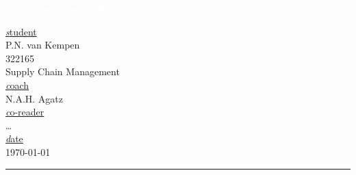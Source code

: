 \begin{titlingpage}
\linespread{1}\selectfont

\BgThispage
{}
\vspace*{2cm}
\noindent
\textcolor{white}{\bigsf Airfare lock-in products}
\vspace*{1.7cm}\par
\noindent
\begin{minipage}{0.35\linewidth}
    \begin{flushright}
    \underline {\small \textit student}\vspace{0.3ex}\\
    P.N. van Kempen \\
    322165 \\
    Supply Chain Management\vspace{3ex} \\
    \underline {\small \textit coach}\vspace{0.3ex}\\
    N.A.H. Agatz\vspace{1.5ex} \\
    \underline {\small \textit co-reader}\vspace{0.3ex}\\
    \ldots\vspace{3ex}\\
    \underline {\small \textit date}\vspace{0.3ex}\\
    \today\\
    \end{flushright}
\end{minipage} \hspace{15pt}
%
\begin{minipage}{0.02\linewidth}
    \rule{1pt}{175pt}
\end{minipage} \hspace{-10pt}
%
\begin{minipage}{0.6\linewidth}
\vspace{5pt}
    \begin{abstract}
In this master's thesis I want to research whether it is sustainable for an external company without capacity information or seat reservation capabilities to set the price of airfare~lock-in~products at a level that the customer accepts. An airfare~lock-in product gives its holder the right --- but not the obligation --- to buy the underlying flight ticket for a predetermined price on or before the maturity date. The research questions will be tested using a theoretical framework and empirical data gathered on 22~routes for a period of 12~weeks. The acquired data will also function as the census for the two option valuation methods (i.e. \emph{Black--Scholes}, and \emph{Monte Carlo}) and the simulation model to assess the external company's performance. Lastly, sensitivity analysis on the properties associated with the option buyer -- \emph{risk utility}, \emph{forecast accuracy}, and \emph{likelihood of traveling} --- is carried out to see the impact of these aspects on the returns of the option seller.
    \end{abstract}
\end{minipage}
\end{titlingpage}
\restoregeometry
